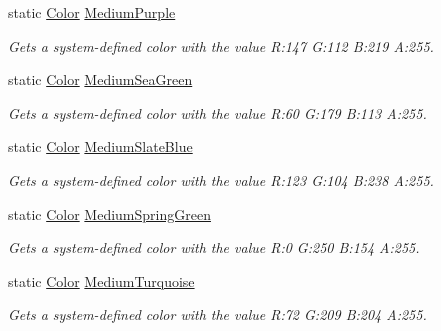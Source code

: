 \begin{DoxyCompactItemize}
static \hyperlink{struct_microsoft_1_1_xna_1_1_framework_1_1_color}{Color} \hyperlink{struct_microsoft_1_1_xna_1_1_framework_1_1_color_a67f0eb2d2319408d1b10be51aa44969b}{Medium\+Purple}
\begin{DoxyCompactList}\small\item\em Gets a system-\/defined color with the value R\+:147 G\+:112 B\+:219 A\+:255.\end{DoxyCompactList}\item 
static \hyperlink{struct_microsoft_1_1_xna_1_1_framework_1_1_color}{Color} \hyperlink{struct_microsoft_1_1_xna_1_1_framework_1_1_color_ac99798bf3050c72d16596bf761a82c3c}{Medium\+Sea\+Green}
\begin{DoxyCompactList}\small\item\em Gets a system-\/defined color with the value R\+:60 G\+:179 B\+:113 A\+:255.\end{DoxyCompactList}\item 
static \hyperlink{struct_microsoft_1_1_xna_1_1_framework_1_1_color}{Color} \hyperlink{struct_microsoft_1_1_xna_1_1_framework_1_1_color_a8bde7d3788b0dca7173f8c26b1ad9914}{Medium\+Slate\+Blue}
\begin{DoxyCompactList}\small\item\em Gets a system-\/defined color with the value R\+:123 G\+:104 B\+:238 A\+:255.\end{DoxyCompactList}\item 
static \hyperlink{struct_microsoft_1_1_xna_1_1_framework_1_1_color}{Color} \hyperlink{struct_microsoft_1_1_xna_1_1_framework_1_1_color_a4fe9744e338c94ff3b0f98543d68c3ba}{Medium\+Spring\+Green}
\begin{DoxyCompactList}\small\item\em Gets a system-\/defined color with the value R\+:0 G\+:250 B\+:154 A\+:255.\end{DoxyCompactList}\item 
static \hyperlink{struct_microsoft_1_1_xna_1_1_framework_1_1_color}{Color} \hyperlink{struct_microsoft_1_1_xna_1_1_framework_1_1_color_a893929dba6b4ac74a739e0f236f8fc6e}{Medium\+Turquoise}
\begin{DoxyCompactList}\small\item\em Gets a system-\/defined color with the value R\+:72 G\+:209 B\+:204 A\+:255.\end{DoxyCompactList}\item 

\end{DoxyCompactItemize}
